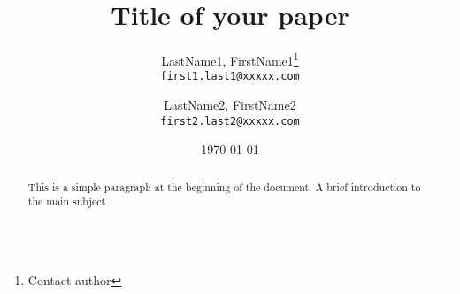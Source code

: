 \documentclass[12pt, letterpaper, twoside]{article}
\title{Title of your paper}
\author{LastName1, FirstName1\thanks{Contact author}\\
  \texttt{first1.last1@xxxxx.com}
  \and
  LastName2, FirstName2\\
  \texttt{first2.last2@xxxxx.com}}
\date{\today}
\begin{document}
\maketitle

\begin{abstract}
This is a simple paragraph at the beginning of the document. A brief introduction to the main subject.
\end{abstract}






\end{document}
